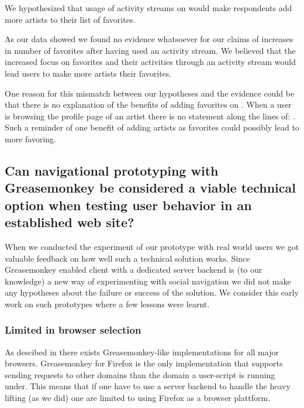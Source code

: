 We hypothesized that usage of activity streams on \urort{} would
make respondents add more artists to their list of favorites.

As our data%
showed we found no evidence whatsoever for our claims of increases in
number of favorites after having used an activity stream.
We believed that the increased focus on favorites and their activities through
an activity stream would lead users to make more artists their favorites.

One reason for this mismatch between our hypotheses and the evidence could be
that there is no explanation of the benefits of adding favorites on \urort{}.
When a user is browsing the profile page of an artist there is no statement
along the lines of: . Such a reminder of one benefit of adding
artists as favorites could possibly lead to more favoring.

\subsection{%
  Can navigational prototyping with Greasemonkey be considered a
  viable technical option when testing user behavior in an
  established web site?
}

When we conducted the experiment of our prototype with real world users
we got valuable feedback on how well such a technical solution works.
Since Greasemonkey enabled client with a dedicated server backend is (to our
knowledge) a new way of experimenting with social navigation we did not
make any hypotheses about the failure or success of the solution.
We consider this early work on such prototypes where a few lessons
were learnt.

\subsubsection{Limited in browser selection}

As descibed in
 there exists Greasemonkey-like
implementations for all major browsers. Greasemonkey for Firefox is the only
implementation that supports sending requests to other domains than the domain
a user-script is running under. This means that if one have to use a server
backend to handle the heavy lifting (as we did) one are limited to
using Firefox as a browser plattform.%

